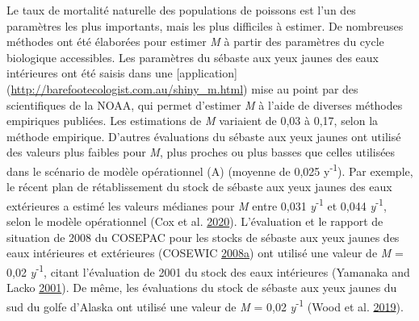 \documentclass[11pt]{book}
\begin{document}
Le taux de mortalité naturelle des populations de poissons est l'un des paramètres les plus importants, mais les plus difficiles à estimer. De nombreuses méthodes ont été élaborées pour estimer \emph{M} à partir des paramètres du cycle biologique accessibles. Les paramètres du sébaste aux yeux jaunes des eaux intérieures ont été saisis dans une {[}application{]} (\url{http://barefootecologist.com.au/shiny_m.html}) mise au point par des scientifiques de la NOAA, qui permet d'estimer \emph{M} à l'aide de diverses méthodes empiriques publiées. Les estimations de \emph{M} variaient de 0,03 à 0,17, selon la méthode empirique. D'autres évaluations du sébaste aux yeux jaunes ont utilisé des valeurs plus faibles pour \emph{M}, plus proches ou plus basses que celles utilisées dans le scénario de modèle opérationnel (A) (moyenne de 0,025 y\textsuperscript{-1}). Par exemple, le récent plan de rétablissement du stock de sébaste aux yeux jaunes des eaux extérieures a estimé les valeurs médianes pour \emph{M} entre 0,031 \emph{y}\textsuperscript{-1} et 0,044 \emph{y}\textsuperscript{-1}, selon le modèle opérationnel (Cox et al. \protect\hyperlink{ref-cox2020}{2020}). L'évaluation et le rapport de situation de 2008 du COSEPAC pour les stocks de sébaste aux yeux jaunes des eaux intérieures et extérieures (COSEWIC \protect\hyperlink{ref-cosewic2008}{2008}\protect\hyperlink{ref-cosewic2008}{a}) ont utilisé une valeur de \emph{M} = 0,02 \emph{y}\textsuperscript{-1}, citant l'évaluation de 2001 du stock des eaux intérieures (Yamanaka and Lacko \protect\hyperlink{ref-yamanaka2001}{2001}). De même, les évaluations du stock de sébaste aux yeux jaunes du sud du golfe d'Alaska ont utilisé une valeur de \emph{M} = 0,02 \emph{y}\textsuperscript{-1} (Wood et al. \protect\hyperlink{ref-wood2019}{2019}).
\end{document}
